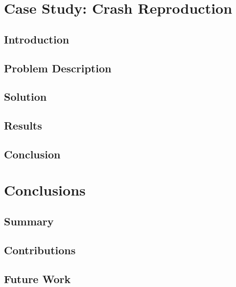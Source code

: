 \chapter{Case Study: Crash Reproduction}
\label{chap:case_study_crash_reproduction}
  \section{Introduction}
  \label{sec:introduction}
    \Blindtext
  \section{Problem Description}
  \label{sec:problem_description}
    \Blindtext
  \section{Solution}
  \label{sec:solution}
    \Blindtext
  \section{Results}
  \label{sec:results}
    \Blindtext
  \section{Conclusion}
  \label{sec:conclusion}
    \Blindtext

\chapter{Conclusions}
\label{chap:conclusions}
  \section{Summary}
  \label{sec:summary}
    \Blindtext
  \section{Contributions}
  \label{sec:contributions}
    \Blindtext
  \section{Future Work}
  \label{sec:future_work}
    \Blindtext
